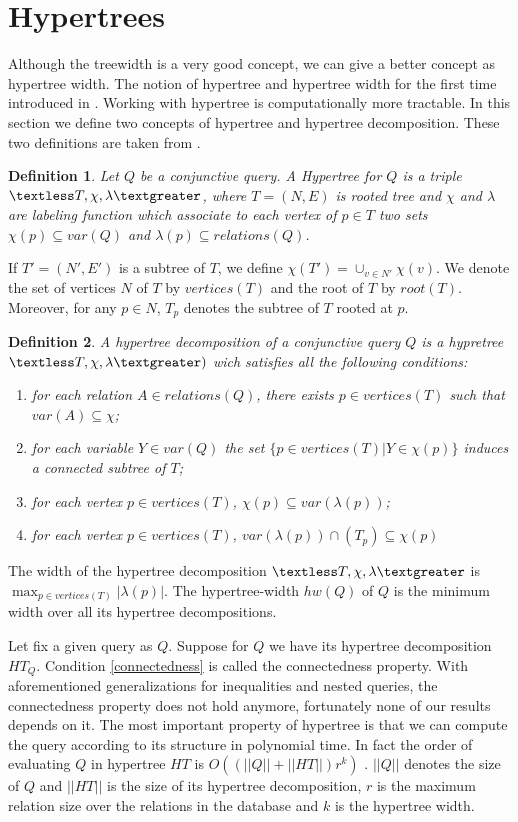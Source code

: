 \documentclass[12pt]{article}
\newtheorem{definition}{Definition}
\begin{document}
\section{Hypertrees}
Although the treewidth is a very good concept, we can give a better concept as hypertree width. The notion of hypertree and hypertree width for the first time introduced in \cite{1}. Working with hypertree is computationally more tractable. 
In this section we define two concepts of hypertree and hypertree decomposition.
These two definitions are taken from \cite{1}.
\begin{definition}
\label{def:ht}
Let $Q$ be a conjunctive query. A Hypertree for $Q$ is a triple $\textless T,\chi,\lambda\textgreater$, where  $T=(N,E)$ is rooted tree and $\chi$ and $\lambda$ are labeling function which associate to each vertex of $p\in T$ two sets $\chi(p)\subseteq var(Q)$ and $\lambda(p)\subseteq relations(Q)$.
\end{definition}
If $T'=(N',E')$ is a subtree of $T$, we define $\chi(T')=\cup_{v\in N'}\chi(v)$. We denote the set of vertices $N$ of $T$ by $vertices(T)$ and the root of $T$ by $root(T)$. Moreover, for any $p\in N$, $T_{p}$ denotes the subtree of $T$ rooted at $p$.
\begin{definition}
\label{def:htd}
A hypertree decomposition of a conjunctive query $Q$ is a hypretree $\textless T,\chi,\lambda\textgreater)$ wich satisfies all the following conditions:
\begin{enumerate}
\item for each relation $A\in relations(Q)$, there exists $p\in vertices(T)$ such that $var(A)\subseteq \chi$;
\item for each variable $Y\in var(Q)$ the set $\{p\in vertices(T)|Y\in\chi(p)\}$ induces a connected subtree of $T$;\label{connectedness}
\item for each vertex $p\in vertices(T)$, $\chi(p)\subseteq var(\lambda(p))$;
\item for each vertex $p\in vertices(T)$, $var(\lambda(p))\cap(T_{p})\subseteq \chi(p)$
\end{enumerate}
\end{definition}
The width of the hypertree decomposition $\textless T,\chi,\lambda\textgreater$ is $\max_{p\in vertices(T)}|\lambda(p)|$. The hypertree-width $hw(Q)$ of $Q$ is the minimum width over all its hypertree decompositions.\par
Let fix a given query  as $Q$. Suppose for $Q$  we have its hypertree decomposition $HT_{Q}$. 
Condition \ref{connectedness} is called the connectedness property. 
With aforementioned generalizations for inequalities and nested queries, the connectedness property does not hold anymore, fortunately none of our results depends on it. 
The most important property of hypertree is that we can compute the query according to its structure in polynomial time. In fact the order of evaluating $Q$ in hypertree $HT$ is $O((||Q||+||HT||)r^{k})$ \cite{1}. $||Q||$ denotes the size of $Q$ and $||HT||$ is the size of its hypertree decomposition, $r$ is the maximum relation size over the relations in the database and $k$ is the hypertree width. \par
\end{document}
